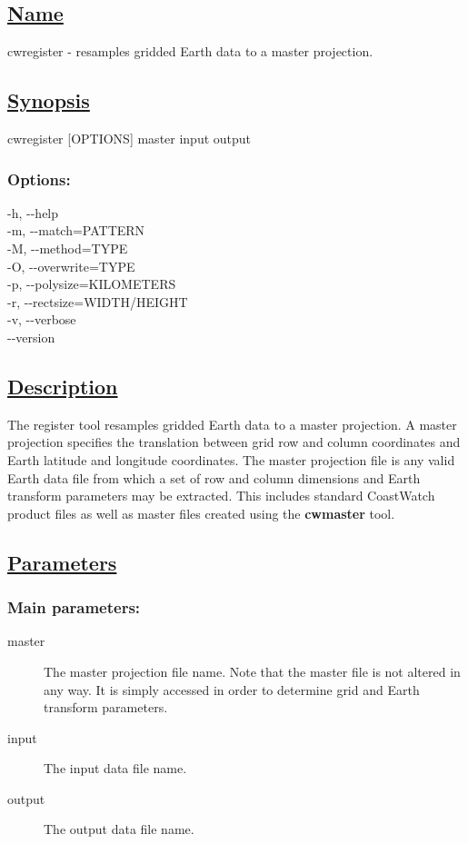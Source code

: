 \subsection*{\underline{Name}}


   cwregister - resamples gridded Earth data to a master projection.  
\subsection*{\underline{Synopsis}}


 cwregister [OPTIONS] master input output
\subsubsection*{Options:}


  -h, -{-}help \\ 
 -m, -{-}match=PATTERN \\ 
 -M, -{-}method=TYPE \\ 
 -O, -{-}overwrite=TYPE \\ 
 -p, -{-}polysize=KILOMETERS \\ 
 -r, -{-}rectsize=WIDTH/HEIGHT \\ 
 -v, -{-}verbose \\ 
 -{-}version \\ 

\subsection*{\underline{Description}}


  The register tool resamples gridded Earth data to a master projection. A master projection specifies the translation between grid row and column coordinates and Earth latitude and longitude coordinates. The master projection file is any valid Earth data file from which a set of row and column dimensions and Earth transform parameters may be extracted. This includes standard CoastWatch product files as well as master files created using the \textbf{cwmaster}
 tool. 
\subsection*{\underline{Parameters}}
\subsubsection*{Main parameters:}
\begin{description}
\item[master]The master projection file name. Note that the master file is not altered in any way. It is simply accessed in order to determine grid and Earth transform parameters.
\item[input]The input data file name.
\item[output]The output data file name.

\end{description}
